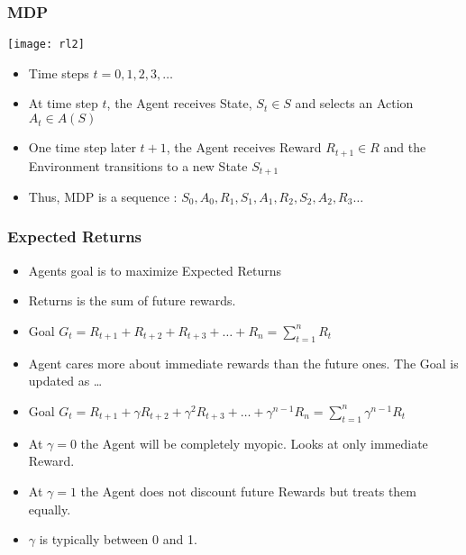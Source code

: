\begin{frame}[fragile]\frametitle{MDP}

\begin{center}
\texttt{[image: rl2]}
\end{center}

\begin{itemize}
\item Time steps $t = 0,1,2,3,\ldots$
\item At time step $t$, the Agent receives State, $S_t \in S$ and selects an Action $A_t \in A(S)$
\item One time step later $t+1$, the Agent receives Reward $R_{t+1} \in R$ and the Environment transitions to a new State $S_{t+1}$
\item Thus, MDP is a sequence : $S_0,A_0,R_1,S_1,A_1,R_2,S_2,A_2,R_3\ldots$
\end{itemize}

\end{frame}

\begin{frame}[fragile]\frametitle{Expected Returns}

\begin{itemize}
\item Agents goal is to maximize Expected Returns
\item Returns is the sum of future rewards.
\item Goal $G_t= R_{t+1} + R_{t+2} + R_{t+3} + \ldots + R_n = \sum_{t=1}^{n}R_t$
\item Agent cares more about immediate rewards than the future ones. The Goal is updated as \ldots
\item Goal $G_t= R_{t+1} + \gamma R_{t+2} + \gamma^2 R_{t+3} + \ldots + \gamma^{n-1}R_n = \sum_{t=1}^{n}\gamma^{n-1}R_t$
\item At $\gamma = 0$ the Agent will be completely myopic. Looks at only immediate Reward.
\item At $\gamma = 1$ the Agent does not discount future Rewards but treats them equally.
\item $\gamma$ is typically between 0 and 1.

\end{itemize}

\end{frame}



